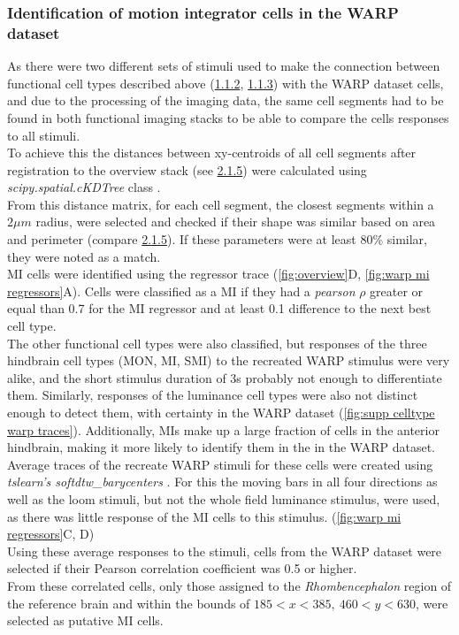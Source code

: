 \documentclass[12pt, a4paper, oneside]{article}
\begin{document}
\subsubsection{Identification of motion integrator cells in the WARP dataset}
\label{sec:warp mi}
As there were two different sets of stimuli used to make the connection between functional cell types described above (\hyperref[sec:omr]{1.1.2}, \hyperref[sec:phototaxis]{1.1.3}) with the WARP dataset cells, and due to the processing of the imaging data, the same cell segments had to be found in both functional imaging stacks to be able to compare the cells responses to all stimuli.\\
To achieve this the distances between xy-centroids of all cell segments after registration to the overview stack (see \hyperref[sec:image preproc]{2.1.5}) were calculated using \textit{scipy.spatial.cKDTree} class \parencite{maneewongvatanaAnalysisApproximateNearest1999}.\\
From this distance matrix, for each cell segment, the closest segments within a $2\mu m$ radius, were selected and checked if their shape was similar based on area and perimeter (compare \hyperref[sec:image preproc]{2.1.5}). If these parameters were at least 80\% similar, they were noted as a match.\\
MI cells were identified using the regressor trace (\autoref{fig:overview}D, \autoref{fig:warp mi regressors}A). Cells were classified as a MI if they had a \textit{pearson} $\rho$ greater or equal than 0.7 for the MI regressor and at least 0.1 difference to the next best cell type.\\
The other functional cell types were also classified, but responses of the three hindbrain cell types (MON, MI, SMI) to the recreated WARP stimulus were very alike, and the short stimulus duration of 3s probably not enough to differentiate them. Similarly, responses of the luminance cell types were also not distinct enough to detect them, with certainty in the WARP dataset (\autoref{fig:supp celltype warp traces}). Additionally, MIs make up a large fraction of cells in the anterior hindbrain, making it more likely to identify them in the in the WARP dataset.\\ 
Average traces of the recreate WARP stimuli for these cells were created using \textit{tslearn's softdtw\_barycenters} \parencite{tavenardTslearnMachineLearning2020, cuturiSoftDTWDifferentiableLoss2017}. For this the moving bars in all four directions as well as the loom stimuli, but not the whole field luminance stimulus, were used, as there was little response of the MI cells to this stimulus. (\autoref{fig:warp mi regressors}C, D)\\
Using these average responses to the stimuli, cells from the WARP dataset were selected if their Pearson correlation coefficient was 0.5 or higher.\\
From these correlated cells, only those assigned to the \textit{Rhombencephalon} region of the reference brain and within the bounds of $185 < x < 385,\ 460 < y < 630$, were selected as putative MI cells.\\
\end{document}
